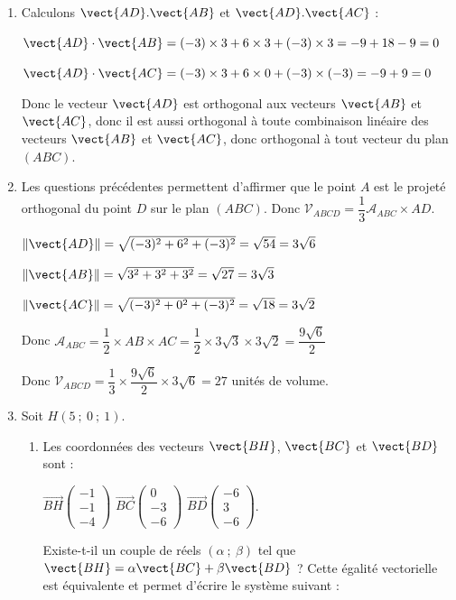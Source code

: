 \begin{enumerate}
Le triangle $ABC$ est rectangle est rectangle en $A$.
\item Calculons $\vect{AD}.\vect{AB}$ et $\vect{AD}.\vect{AC}$ :

$\vect{AD} \cdot \vect{AB}= (-3)\times 3+6\times 3 + (-3)\times 3 = - 9+18-9=0$

$\vect{AD} \cdot \vect{AC}= (-3)\times 3+6\times 0 + (-3)\times (-3)=-9+9=0$

Donc le vecteur $\vect{AD}$ est orthogonal aux vecteurs $\vect{AB}$ et $\vect{AC}$, donc il est aussi orthogonal à toute combinaison linéaire des vecteurs $\vect{AB}$ et $\vect{AC}$, donc orthogonal à tout vecteur du plan $(ABC)$.
	\item Les questions précédentes permettent d'affirmer que le point $A$ est le projeté orthogonal du point $D$ sur le plan $(ABC)$. Donc $\mathcal{V}_{ABCD} = \dfrac13 \mathcal{A}_{ABC} \times AD$.
	
$\lVert\vect{AD}\rVert=\sqrt{(-3)^2+6^2+(-3)^2}=\sqrt{54}=3\sqrt{6}$

$\lVert\vect{AB}\rVert=\sqrt{3^2+3^2+3^2}=\sqrt{27}=3\sqrt{3}$

$\lVert\vect{AC}\rVert=\sqrt{(-3)^2+0^2+(-3)^2}=\sqrt{18}=3\sqrt{2}$
	
	Donc $\mathcal{A}_{ABC}=\dfrac{1}{2}\times AB\times AC=\dfrac{1}{2} \times 3\sqrt{3} \times 3\sqrt{2}=\dfrac{9\sqrt{6}}{2}$
	
	Donc $\mathcal{V}_{ABCD}=\dfrac13 \times \dfrac{9\sqrt{6}}{2} \times 3\sqrt{6}= 27 $ unités de volume.
\item Soit $H(5~;~0~;~1)$.
	\begin{enumerate}
		\item Les coordonnées des vecteurs $\vect{BH}$, $\vect{BC}$ et $\vect{BD}$ sont :

\(\overrightarrow{BH}\begin{pmatrix}-1\\-1\\-4\end{pmatrix}\) \quad \(\overrightarrow{BC}\begin{pmatrix}0\\- 3\\- 6\end{pmatrix}\) \quad \(\overrightarrow{BD}\begin{pmatrix}- 6\\3\\- 6\end{pmatrix}\).

Existe-t-il un couple de réels $(\alpha~;~\beta)$ tel que $\vect{BH}=\alpha\vect{BC}+\beta\vect{BD}$ ? Cette égalité vectorielle est équivalente et permet d'écrire le système suivant :


\end{enumerate}
\end{enumerate}
